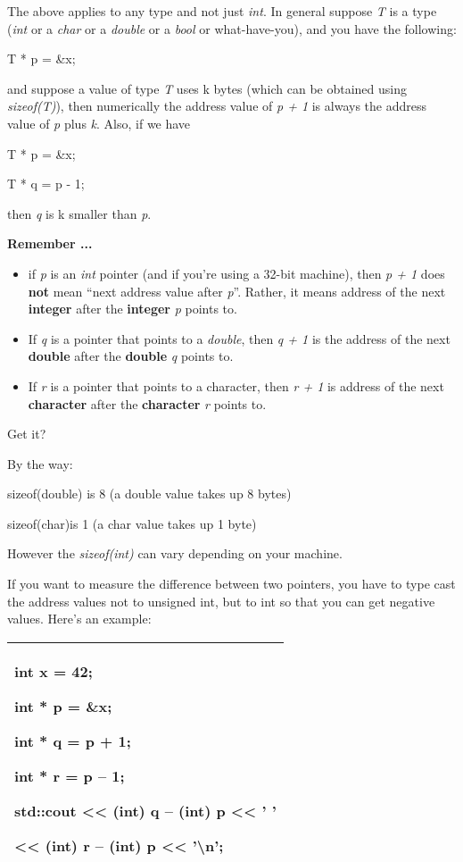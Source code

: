 \documentclass[
]{article}
\providecommand{\tightlist}{%
  \setlength{\itemsep}{0pt}\setlength{\parskip}{0pt}}
\begin{document}
The above applies to any type and not just \emph{int}. In general
suppose \emph{T} is a type (\emph{int} or a \emph{char} or a
\emph{double} or a \emph{bool} or what-have-you), and you have the
following:

T * p = \&x;

and suppose a value of type \emph{T} uses k bytes (which can be obtained
using \emph{sizeof(T)}), then numerically the address value of \emph{p +
1} is always the address value of \emph{p} plus \emph{k}. Also, if we
have

T * p = \&x;

T * q = p - 1;

then \emph{q} is k smaller than \emph{p}.

\textbf{Remember ...}

\begin{itemize}
\tightlist
\item
  if \emph{p} is an \emph{int }pointer (and if you're using a 32-bit
  machine), then \emph{p + 1 }does \textbf{not} mean ``next address
  value after \emph{p}''. Rather, it means address of the next\textbf{
  integer} after the \textbf{integer} \emph{p} points to.
\item
  If \emph{q} is a pointer that points to a \emph{double}, then \emph{q
  + 1} is the address of the next\textbf{ double} after the
  \textbf{double} \emph{q} points to.
\item
  If \emph{r} is a pointer that points to a character, then \emph{r + 1}
  is address of the next\textbf{ character} after the \textbf{character}
  \emph{r} points to.
\end{itemize}

Get it?

By the way:

sizeof(double) is 8 (a double value takes up 8 bytes)

sizeof(char)is 1 (a char value takes up 1 byte)

However the \emph{sizeof(int)} can vary depending on your machine.

If you want to measure the difference between two pointers, you have to
type cast the address values not to unsigned int, but to int so that you
can get negative values. Here's an example:

\begin{longtable}[]{@{}l@{}}
\toprule
\endhead
\begin{minipage}[t]{0.97\columnwidth}\raggedright
int x = 42;

int * p = \&x;

int * q = p + 1;

int * r = p -- 1;

std::cout \textless\textless{} (int) q -- (int) p \textless\textless{} '
'

\textless\textless{} (int) r -- (int) p \textless\textless{}
'\textbackslash n';\strut
\end{minipage}\tabularnewline
\bottomrule
\end{longtable}
\end{document}
